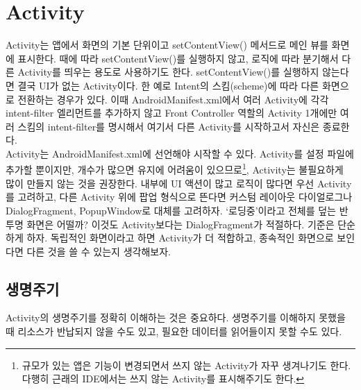 \chapter{Activity}
Activity는 앱에서 화면의 기본 단위이고 setContentView() 메서드로 메인 뷰를 화면에 표시한다.
때에 따라 setContentView()를 실행하지 않고, 로직에 따라 분기해서 다른 Activity를 띄우는 용도로 사용하기도 한다. 
setContentView()를 실행하지 않는다면 결국 UI가 없는 Activity이다.
한 예로 Intent의 스킴(scheme)에 따라 다른 화면으로 전환하는 경우가 있다.
이때 AndroidManifest.xml에서 여러 Activity에 각각 intent-filter 엘리먼트를 추가하지 않고 Front Controller 역할의 Activity 1개에만 여러 스킴의 intent-filter를 명시해서 여기서 다른 Activity를 시작하고서 자신은 종료한다.\\

Activity는 AndroidManifest.xml에 선언해야 시작할 수 있다.
Activity를 설정 파일에 추가할 뿐이지만, 개수가 많으면 유지에 어려움이 있으므로\footnote{규모가 있는 앱은 기능이 변경되면서 쓰지 않는 Activity가 자꾸 생겨나기도 한다. 다행히 근래의 IDE에서는 쓰지 않는 Activity를 표시해주기도 한다.}, Activity는 불필요하게 많이 만들지 않는 것을 권장한다.
내부에 UI 액션이 많고 로직이 많다면 우선 Activity를 고려하고, 
다른 Activity 위에 팝업 형식으로 뜬다면 커스텀 레이아웃 다이얼로그나 DialogFragment, PopupWindow로 대체를 고려하자.
`로딩중'이라고 전체를 덮는 반투명 화면은 어떨까? 이것도 Activity보다는 DialogFragment가 적절하다.
기준은 단순하게 하자. 독립적인 화면이라고 하면 Activity가 더 적합하고, 종속적인 화면으로 보인다면 다른 것을 쓸 수 있는지 생각해보자.\\

\section{생명주기}
Activity의 생명주기를 정확히 이해하는 것은 중요하다. 
생명주기를 이해하지 못했을 때 리소스가 반납되지 않을 수도 있고, 필요한 데이터를 읽어들이지 못할 수도 있다.

